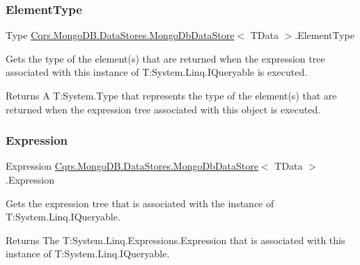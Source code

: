 \subsubsection{\texorpdfstring{Element\+Type}{ElementType}}
{\footnotesize\ttfamily Type \hyperlink{classCqrs_1_1MongoDB_1_1DataStores_1_1MongoDbDataStore}{Cqrs.\+Mongo\+D\+B.\+Data\+Stores.\+Mongo\+Db\+Data\+Store}$<$ T\+Data $>$.Element\+Type\hspace{0.3cm}{\ttfamily [get]}}



Gets the type of the element(s) that are returned when the expression tree associated with this instance of T\+:\+System.\+Linq.\+I\+Queryable is executed. 

\begin{DoxyReturn}{Returns}
A T\+:\+System.\+Type that represents the type of the element(s) that are returned when the expression tree associated with this object is executed. 
\end{DoxyReturn}
\mbox{\label{classCqrs_1_1MongoDB_1_1DataStores_1_1MongoDbDataStore_ade387c1d511dfad22ff7eb752fb842e5_ade387c1d511dfad22ff7eb752fb842e5}} 
\subsubsection{\texorpdfstring{Expression}{Expression}}
{\footnotesize\ttfamily Expression \hyperlink{classCqrs_1_1MongoDB_1_1DataStores_1_1MongoDbDataStore}{Cqrs.\+Mongo\+D\+B.\+Data\+Stores.\+Mongo\+Db\+Data\+Store}$<$ T\+Data $>$.Expression\hspace{0.3cm}{\ttfamily [get]}}



Gets the expression tree that is associated with the instance of T\+:\+System.\+Linq.\+I\+Queryable. 

\begin{DoxyReturn}{Returns}
The T\+:\+System.\+Linq.\+Expressions.\+Expression that is associated with this instance of T\+:\+System.\+Linq.\+I\+Queryable. 
\end{DoxyReturn}
\mbox{\label{classCqrs_1_1MongoDB_1_1DataStores_1_1MongoDbDataStore_a1258497689d7f866b2bc219cd8268b7d_a1258497689d7f866b2bc219cd8268b7d}} 
